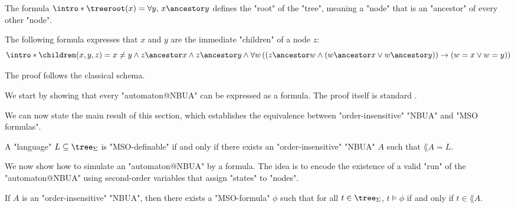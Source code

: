 \documentclass[a4paper,UKenglish,cleveref, autoref, thm-restate]{lipics-v2021}
\begin{document}
\begin{example}
	\AP The formula $\intro* \treeroot(x) = \forall y,\, x \ancestor y$ defines the "root" of the "tree",
	meaning a "node" that is an "ancestor" of every other "node".
\end{example}

\begin{example}
	\AP The following formula expresses that $x$ and $y$ are the immediate "children" of a node $z$:
	\[
		\intro* \children(x,y,z) =
		x \neq y \land
		z \ancestor x \land  z \ancestor y \land
		\forall w
		\left( \left(
			z \ancestor w \land
				(w \ancestor x \lor w \ancestor  y) \right) \rightarrow (
			w = x \lor w = y
			)
		\right)
	\]
\end{example}

The proof follows the classical schema.

We start by showing that every "automaton@NBUA" can be expressed as a formula. The proof itself is standard \cite{Buchi60, Thomas1997, bookautomata}.

We can now state the main result of this section, which establishes the equivalence between "order-insensitive" "NBUA" and "MSO formulas".

\begin{theorem}\label{thm:MSO-NBUA}
	A "language" $L \subseteq \tree_{\Sigma}$ is "MSO-definable" if and only if there exists an "order-insensitive" "NBUA" $A$ such that $\lang A = L$.
\end{theorem}


We now show how to simulate an "automaton@NBUA" by a formula. The idea is to encode the existence of a valid "run" of
the "automaton@NBUA" using second-order variables that assign "states" to "nodes".

\begin{lemma}\label{lem:Aut-to-MSO}
	If $A$ is an "order-insensitive" "NBUA", then there exists a "MSO-formula" $\phi$ such that for all $t \in \tree_{\Sigma}$, $t \models \phi$ if and only if $t \in \lang A$.
\end{lemma}
\end{document}
